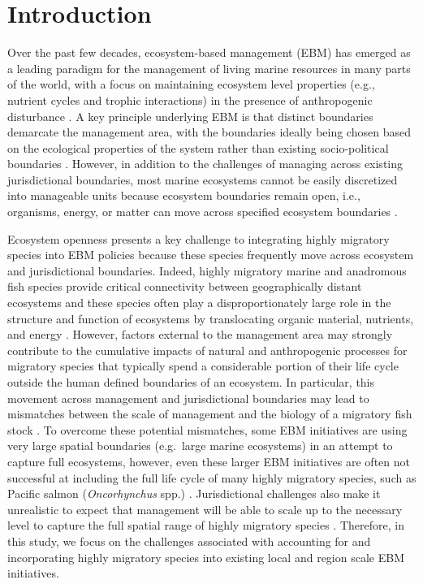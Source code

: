 \section{Introduction}

Over the past few decades, ecosystem-based management (EBM) has emerged as a
leading paradigm for the management of living marine resources in many parts of
the world, with a focus on maintaining ecosystem level properties (e.g.,
nutrient cycles and trophic interactions) in the presence of anthropogenic
disturbance \citep{Engler2015, Skjoldal2008, Fletcher2008, Constable2011,
Olsson2008}. A key principle underlying EBM is that distinct boundaries
demarcate the management area, with the boundaries ideally being chosen based on
the ecological properties of the system rather than existing socio-political
boundaries \citep{Long2015, Engler2015}. However, in addition to the challenges
of managing across existing jurisdictional boundaries, most marine ecosystems
cannot be easily discretized into manageable units because ecosystem boundaries
remain open, i.e., organisms, energy, or matter can move across specified
ecosystem boundaries \citep{ONeill2001}.

Ecosystem openness presents a key challenge to integrating highly migratory
species into EBM policies because these species frequently move across ecosystem
and jurisdictional boundaries. Indeed, highly migratory marine and anadromous
fish species provide critical connectivity between geographically distant
ecosystems and these species often play a disproportionately large role in the
structure and function of ecosystems by translocating organic material,
nutrients, and energy \citep{Lundberg2003, Heupel2015}. However, factors
external to the management area may strongly contribute to the cumulative
impacts of natural and anthropogenic processes for migratory species that
typically spend a considerable portion of their life cycle outside the human
defined boundaries of an ecosystem. In particular, this movement across
management and jurisdictional boundaries may lead to mismatches between the
scale of management and the biology of a migratory fish stock \citep{Cash2006a,
Epstein2015}. To overcome these potential mismatches, some EBM initiatives are
using very large spatial boundaries (e.g.~large marine ecosystems) in an attempt
to capture full ecosystems, however, even these larger EBM initiatives are often
not successful at including the full life cycle of many highly migratory
species, such as Pacific salmon (\emph{Oncorhynchus} spp.) \citep{Field2006a,
Sherman1999, Wang2004}. Jurisdictional challenges also make it unrealistic to
expect that management will be able to scale up to the necessary level to
capture the full spatial range of highly migratory species \citep{Cowan2012,
Lascelles2014}. Therefore, in this study, we focus on the challenges associated
with accounting for and incorporating highly migratory species into existing
local and region scale EBM initiatives.

